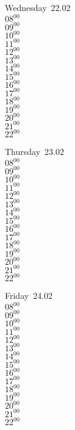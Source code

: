 \documentclass[11pt,a4paper]{book}\usepackage[]{graphicx}\usepackage[]{color}
\begin{document}
\begin{weekdaybox}
  Wednesday~22.02\\
  { 
  \vfill
  $08^{00}$\\
$09^{00}$\\
$10^{00}$\\
$11^{00}$\\
$12^{00}$\\
$13^{00}$\\
$14^{00}$\\
$15^{00}$\\
$16^{00}$\\
$17^{00}$\\
$18^{00}$\\
$19^{00}$\\
$20^{00}$\\
$21^{00}$\\
$22^{00}$\\
  }
\end{weekdaybox}
\clearpage
\begin{headerbox}
\end{headerbox}
\begin{weekdaybox}
  Thursday~23.02\\
  { 
  \vfill
  $08^{00}$\\
$09^{00}$\\
$10^{00}$\\
$11^{00}$\\
$12^{00}$\\
$13^{00}$\\
$14^{00}$\\
$15^{00}$\\
$16^{00}$\\
$17^{00}$\\
$18^{00}$\\
$19^{00}$\\
$20^{00}$\\
$21^{00}$\\
$22^{00}$\\
  }
\end{weekdaybox} 
\begin{weekdaybox}
  Friday~24.02\\
  { 
  \vfill
  $08^{00}$\\
$09^{00}$\\
$10^{00}$\\
$11^{00}$\\
$12^{00}$\\
$13^{00}$\\
$14^{00}$\\
$15^{00}$\\
$16^{00}$\\
$17^{00}$\\
$18^{00}$\\
$19^{00}$\\
$20^{00}$\\
$21^{00}$\\
$22^{00}$\\
  }
\end{weekdaybox}
\end{document}
